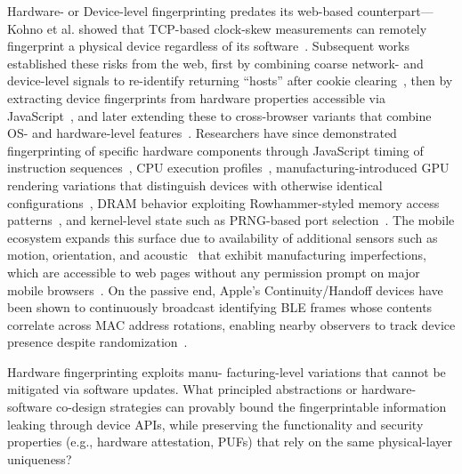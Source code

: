 Hardware- or Device-level fingerprinting predates its web-based counterpart---Kohno et al. showed that TCP-based clock-skew measurements can remotely fingerprint a physical device regardless of its software~\cite{kohnoRemotePhysicalDevice2005}.
%
Subsequent works established these risks from the web, first by combining coarse network- and device-level signals to re-identify returning ``hosts'' after cookie clearing~\cite{yenHostFingerprintingTracking2012}, then by extracting device fingerprints from hardware properties accessible via JavaScript~\cite{nikiforakisCookielessMonsterExploring2013}, and later extending these to cross-browser variants that combine OS- and hardware-level features~\cite{caoCrossBrowserFingerprintingOS2017}.
%
Researchers have since demonstrated fingerprinting of specific hardware components through JavaScript timing of instruction sequences~\cite{sanchez-rolaClockClockTimeBased2018}, CPU execution profiles~\cite{trampertBrowserBasedCPUFingerprinting2022,matyuninTrackingPrivateBrowsing2018}, manufacturing-introduced GPU rendering variations that distinguish devices with otherwise identical configurations~\cite{laorDRAWNAPARTDevice2022}, DRAM behavior exploiting Rowhammer-styled memory access patterns~\cite{venugopalanFPRowhammerDRAMBasedDevice2024}, and kernel-level state such as PRNG-based port selection~\cite{kleinCrossLayerAttacks2021,kol2023device}.
%
The mobile ecosystem expands this surface due to availability of additional sensors such as motion, orientation, and acoustic~\cite{deyAccelPrintImperfectionsAccelerometers2014,zhang2019sensorid,zhouAcousticFingerprintingRevisited2014} that exhibit manufacturing imperfections, which are accessible to web pages without any permission prompt on major mobile browsers~\cite{dasWebsSixthSense2018,dasTrackingMobileWeb2016,dasEveryMoveYou2018,marcantoniLargescaleStudyRisks2019,hupperichRobustnessMobileDevice2015}.
%
On the passive end, Apple's Continuity/Handoff devices have been shown to continuously broadcast identifying BLE frames whose contents correlate across MAC address rotations, enabling nearby observers to track device presence despite randomization~\cite{martinHandoffAllYour2019}.

\begin{opbox}
Hardware fingerprinting exploits manu- facturing-level variations that cannot be mitigated via software updates. What principled abstractions or hardware-software co-design strategies can provably bound the fingerprintable information leaking through device APIs, while preserving the functionality and security properties (e.g., hardware attestation, PUFs) that rely on the same physical-layer uniqueness?
\end{opbox}


